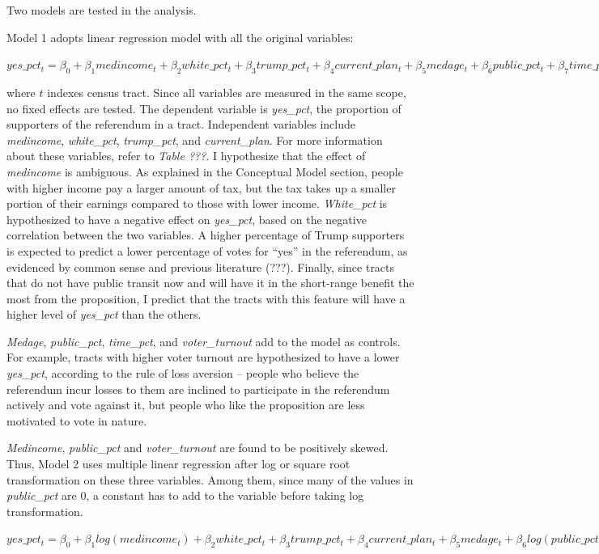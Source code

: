\documentclass[
]{article}
\begin{document}
Two models are tested in the analysis.

Model 1 adopts linear regression model with all the original variables:

\(yes\_pct_t = \beta_0+\beta_1medincome_t+\beta_2white\_pct_t+\beta_3trump\_pct_t+\beta_4current\_plan_t+\beta_5medage_t+\beta_6public\_pct_t+\beta_7time\_pct_t+\beta_8voter\_turnout_t+\epsilon_t\)

where \(t\) indexes census tract. Since all variables are measured in
the same scope, no fixed effects are tested. The dependent variable is
\emph{yes\_pct}, the proportion of supporters of the referendum in a
tract. Independent variables include \emph{medincome},
\emph{white\_pct}, \emph{trump\_pct}, and \emph{current\_plan}. For more
information about these variables, refer to \emph{Table ???}. I
hypothesize that the effect of \emph{medincome} is ambiguous. As
explained in the Conceptual Model section, people with higher income pay
a larger amount of tax, but the tax takes up a smaller portion of their
earnings compared to those with lower income. \emph{White\_pct} is
hypothesized to have a negative effect on \emph{yes\_pct}, based on the
negative correlation between the two variables. A higher percentage of
Trump supporters is expected to predict a lower percentage of votes for
``yes'' in the referendum, as evidenced by common sense and previous
literature (???). Finally, since tracts that do not have public transit
now and will have it in the short-range benefit the most from the
proposition, I predict that the tracts with this feature will have a
higher level of \emph{yes\_pct} than the others.

\emph{Medage}, \emph{public\_pct}, \emph{time\_pct}, and
\emph{voter\_turnout} add to the model as controls. For example, tracts
with higher voter turnout are hypothesized to have a lower
\emph{yes\_pct}, according to the rule of loss aversion -- people who
believe the referendum incur losses to them are inclined to participate
in the referendum actively and vote against it, but people who like the
proposition are less motivated to vote in nature.

\emph{Medincome}, \emph{public\_pct} and \emph{voter\_turnout} are found
to be positively skewed. Thus, Model 2 uses multiple linear regression
after log or square root transformation on these three variables. Among
them, since many of the values in \emph{public\_pct} are 0, a constant
has to add to the variable before taking log transformation.

\(yes\_pct_t = \beta_0+\beta_1log(medincome_t)+\beta_2white\_pct_t+\beta_3trump\_pct_t+\beta_4current\_plan_t+\beta_5medage_t+\beta_6log(public\_pct_t + 0.01)+\beta_7time\_pct_t+\beta_8\sqrt{voter\_turnout_t}+\epsilon_t\)
\end{document}
